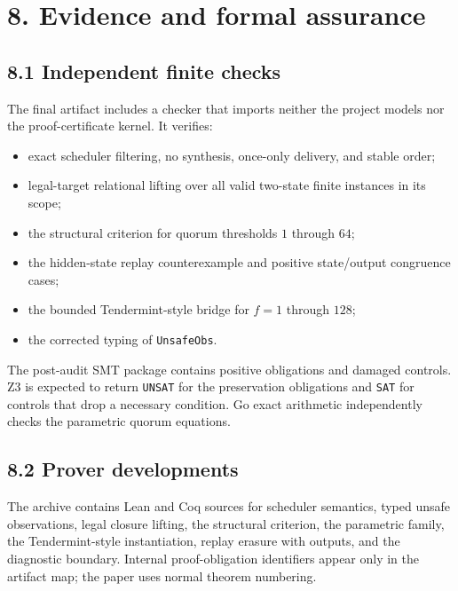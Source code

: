 \section{8. Evidence and formal
assurance}\label{evidence-and-formal-assurance}

\subsection{8.1 Independent finite
checks}\label{independent-finite-checks}

The final artifact includes a checker that imports neither the project
models nor the proof-certificate kernel. It verifies:

\begin{itemize}
\tightlist
\item
  exact scheduler filtering, no synthesis, once-only delivery, and
  stable order;
\item
  legal-target relational lifting over all valid two-state finite
  instances in its scope;
\item
  the structural criterion for quorum thresholds \(1\) through \(64\);
\item
  the hidden-state replay counterexample and positive state/output
  congruence cases;
\item
  the bounded Tendermint-style bridge for \(f=1\) through \(128\);
\item
  the corrected typing of \texttt{UnsafeObs}.
\end{itemize}

The post-audit SMT package contains positive obligations and damaged
controls. Z3 \cite{moura2008z3} is expected to return \texttt{UNSAT} for
the preservation obligations and \texttt{SAT} for controls that drop a
necessary condition. Go exact arithmetic independently checks the
parametric quorum equations.

\subsection{8.2 Prover developments}\label{prover-developments}

The archive contains Lean and Coq sources for scheduler semantics, typed
unsafe observations, legal closure lifting, the structural criterion,
the parametric family, the Tendermint-style instantiation, replay
erasure with outputs, and the diagnostic boundary. Internal
proof-obligation identifiers appear only in the artifact map; the paper
uses normal theorem numbering.

